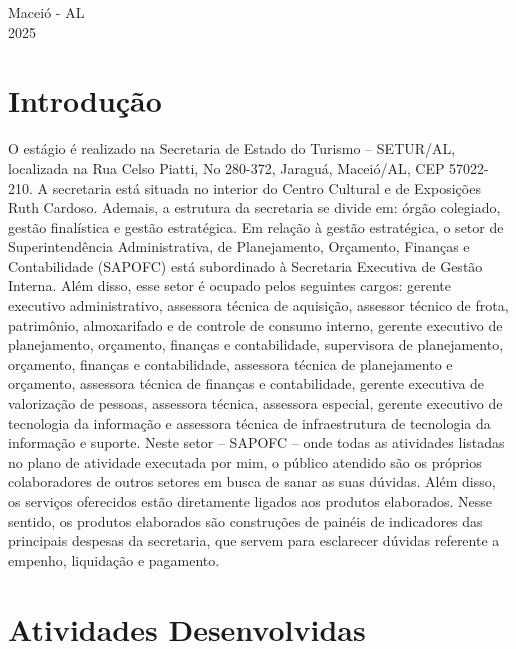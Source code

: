 \documentclass[12pt,a4paper]{article}
\begin{document}
	\vfill
	\begin{flushright}
		\centering Maceió - AL \\
		2025
	\end{flushright}
	
	\newpage
	

	
	\section{Introdução}
	
\hspace*{1,5cm}O estágio é realizado na Secretaria de Estado do Turismo – SETUR/AL, localizada na
Rua Celso Piatti, No 280-372, Jaraguá, Maceió/AL, CEP 57022-210. A secretaria está situada
no interior do Centro Cultural e de Exposições Ruth Cardoso. Ademais, a estrutura da secretaria
se divide em: órgão colegiado, gestão finalística e gestão estratégica. Em relação à gestão
estratégica, o setor de Superintendência Administrativa, de Planejamento, Orçamento, Finanças
e Contabilidade (SAPOFC) está subordinado à Secretaria Executiva de Gestão Interna. Além
disso, esse setor é ocupado pelos seguintes cargos: gerente executivo administrativo, assessora
técnica de aquisição, assessor técnico de frota, patrimônio, almoxarifado e de controle de
consumo interno, gerente executivo de planejamento, orçamento, finanças e contabilidade,
supervisora de planejamento, orçamento, finanças e contabilidade, assessora técnica de
planejamento e orçamento, assessora técnica de finanças e contabilidade, gerente executiva de
valorização de pessoas, assessora técnica, assessora especial, gerente executivo de tecnologia
da informação e assessora técnica de infraestrutura de tecnologia da informação e suporte. Neste
setor – SAPOFC – onde todas as atividades listadas no plano de atividade executada por mim,
o público atendido são os próprios colaboradores de outros setores em busca de sanar as suas
dúvidas. Além disso, os serviços oferecidos estão diretamente ligados aos produtos elaborados.
Nesse sentido, os produtos elaborados são construções de painéis de indicadores das principais
despesas da secretaria, que servem para esclarecer dúvidas referente a empenho, liquidação e
pagamento.
	
	\section{Atividades Desenvolvidas}
	
\end{document}
